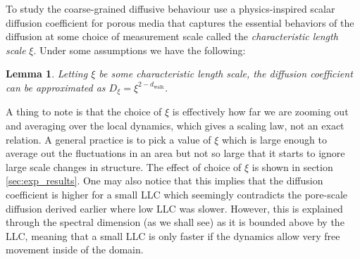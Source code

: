\documentclass{article} %
\newtheorem{lemma}{Lemma}[section]
\theoremstyle{definition}
\begin{document}
To study the coarse-grained diffusive behaviour use a physics-inspired scalar diffusion coefficient for porous media that captures the essential behaviors of the diffusion at some choice of measurement scale called the \textit{characteristic length scale} $\xi$. Under some assumptions we have the following:
\begin{lemma}\label{lem:character_length}
    Letting $\xi$ be some characteristic length scale, the diffusion coefficient can be approximated as $D_\xi = \xi^{2-d_\text{walk}}$.
\end{lemma}
A thing to note is that the choice of $\xi$ is effectively how far we are zooming out and averaging over the local dynamics, which gives a scaling law, not an exact relation. A general practice is to pick a value of $\xi$ which is large enough to average out the fluctuations in an area but not so large that it starts to ignore large scale changes in structure. The effect of choice of $\xi$ is shown in section \ref{sec:exp_results}. One may also notice that this implies that the diffusion coefficient is higher for a small LLC which seemingly contradicts the pore-scale diffusion derived earlier where low LLC was slower. However, this is explained through the spectral dimension (as we shall see) as it is bounded above by the LLC, meaning that a small LLC is only faster if the dynamics allow very free movement inside of the domain. 

\end{document}

